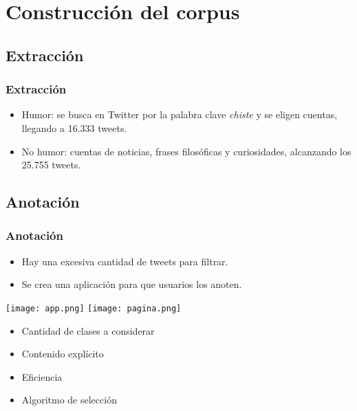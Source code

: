 \section{Construcción del corpus}

\subsection{Extracción}
\begin{frame}
    \frametitle{Extracción}

    \begin{itemize}
        \item Humor: se busca en Twitter por la palabra clave \emph{chiste} y se eligen cuentas, llegando a 16.333 tweets.
        \item No humor: cuentas de noticias, frases filosóficas y curiosidades, alcanzando los 25.755 tweets.
    \end{itemize}
\end{frame}

\subsection{Anotación}
\begin{frame}[allowframebreaks]
    \frametitle{Anotación}

    \begin{itemize}
        \item Hay una excesiva cantidad de tweets para filtrar.
        \item Se crea una aplicación para que usuarios los anoten.
    \end{itemize}

    \framebreak

    \begin{center}
        \texttt{[image: app.png]}
        \hspace{1cm}
        \texttt{[image: pagina.png]}
    \end{center}

    \framebreak

    \begin{itemize}
        \item Cantidad de clases a considerar
        \item Contenido explícito
        \item Eficiencia
        \item Algoritmo de selección
    \end{itemize}
\end{frame}

